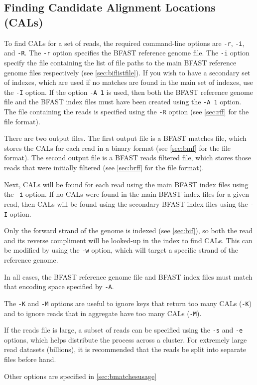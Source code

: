 \documentclass[a4paper,12pt]{book}
\newcommand{\TT}[1]{{\tt #1}} %
\newcommand{\BRGF}{BFAST reference genome file} %
\newcommand{\BIF}{BFAST index file} %
\newcommand{\BMF}{BFAST matches file} %
\newcommand{\BRFF}{BFAST reads filtered file} %
\begin{document}
\subsection{Finding Candidate Alignment Locations (CALs)}
\label{sec:finding-cals}
To find CALs for a set of reads, the required command-line options are \TT{-r}, \TT{-i}, and \TT{-R}.
The \TT{-r} option specifies the \BRGF{}.
The \TT{-i} option specify the file containing the list of file paths to the main \BRGF{s} respectively (see \autoref{sec:biflistfile}).
If you wish to have a secondary set of indexes, which are used if no matches are found in the main set of indexes, use the \TT{-I} option.
If the option \TT{-A 1} is used, then both the \BRGF{} and the \BIF{s} must have been created using the \TT{-A 1} option.
The file containing the reads is specified using the \TT{-R} option (see \autoref{sec:rff} for the file format).

There are two output files.
The first output file is a \BMF{}, which stores the CALs for each read in a binary format (see \autoref{sec:bmf} for the file format).
The second output file is a \BRFF{}, which stores those reads that were initially filtered (see \autoref{sec:brff} for the file format).

Next, CALs will be found for each read using the main \BIF{s} using the \TT{-i} option.
If no CALs were found in the main \BIF{s} for a given read, then CALs will be found using the secondary \BIF{s} using the \TT{-I} option.

Only the forward strand of the genome is indexed (see \autoref{sec:bif}), so both the read and its reverse compliment will be looked-up in the index to find CALs.  
This can be modified by using the \TT{-w} option, which will target a specific strand of the reference genome.

In all cases, the \BRGF{} and \BIF{s} must match that encoding space specified by \TT{-A}.

The \TT{-K} and \TT{-M} options are useful to ignore keys that return too many CALs (\TT{-K}) and to ignore reads that in aggregate have too many CALs (\TT{-M}).

If the reads file is large, a subset of reads can be specified using the \TT{-s} and \TT{-e} options, which helps distribute the process across a cluster.
For extremely large read datasets (billions), it is recommended that the reads be split into separate files before hand.

Other options are specified in \autoref{sec:bmatchesusage}
\end{document}
